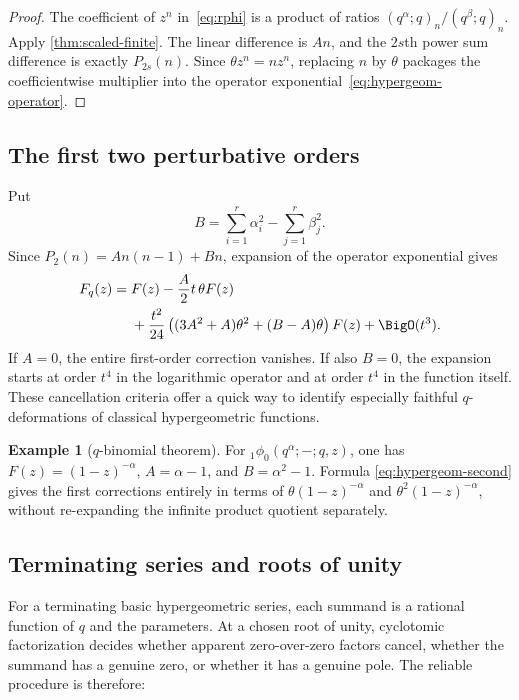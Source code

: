\documentclass[11pt,oneside]{article}
\theoremstyle{definition}
\newtheorem{example}[theorem]{Example}
\theoremstyle{remark}
\let\reportsubsection\subsection
\let\section\reportsubsection
\begin{document}
\begin{proof}
The coefficient of $z^n$ in~\eqref{eq:rphi} is a product of ratios
$(q^\alpha;q)_n/(q^\beta;q)_n$.  Apply
\cref{thm:scaled-finite}.  The linear difference is $An$, and the $2s$th power
sum difference is exactly $P_{2s}(n)$.  Since $\theta z^n=nz^n$, replacing $n$
by $\theta$ packages the coefficientwise multiplier into the operator
exponential~\eqref{eq:hypergeom-operator}.
\end{proof}

\section{The first two perturbative orders}

Put
\[
 B=\sum_{i=1}^{r}\alpha_i^2-
   \sum_{j=1}^{r}\beta_j^2.
\]
Since $P_2(n)=An(n-1)+Bn$, expansion of the operator exponential gives
\begin{align}
 F_q(z)
 ={}&F(z)-\frac A2t\,\theta F(z)
 \notag\\
 &+\frac{t^2}{24}
 \left((3A^2+A)\theta^2+(B-A)\theta\right)F(z)
 +\BigO(t^3).                                      \label{eq:hypergeom-second}
\end{align}
If $A=0$, the entire first-order correction vanishes.  If also $B=0$, the
expansion starts at order $t^4$ in the logarithmic operator and at order $t^4$
in the function itself.  These cancellation criteria offer a quick way to
identify especially faithful $q$-deformations of classical hypergeometric
functions.

\begin{example}[$q$-binomial theorem]
For ${}_1\phi_0(q^\alpha;-;q,z)$, one has
$F(z)=(1-z)^{-\alpha}$,
$A=\alpha-1$, and $B=\alpha^2-1$.  Formula
\eqref{eq:hypergeom-second} gives the first corrections entirely in terms of
$\theta(1-z)^{-\alpha}$ and $\theta^2(1-z)^{-\alpha}$, without re-expanding the
infinite product quotient separately.
\end{example}

\section{Terminating series and roots of unity}

For a terminating basic hypergeometric series, each summand is a rational
function of $q$ and the parameters.  At a chosen root of unity, cyclotomic
factorization decides whether apparent zero-over-zero factors cancel, whether
the summand has a genuine zero, or whether it has a genuine pole.  The reliable
procedure is therefore:
\end{document}
